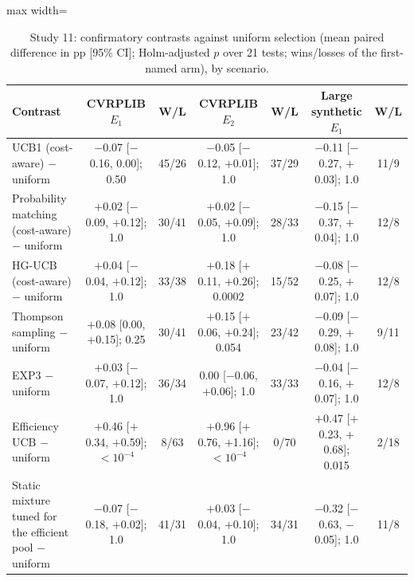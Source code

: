 \begin{table}[t]
\caption{Study 11: confirmatory contrasts against uniform selection (mean paired difference in pp [95\% CI]; Holm-adjusted $p$ over 21 tests; wins/losses of the first-named arm), by scenario.}\label{tab:s11tests}
\centering
\small
\begin{adjustbox}{max width=\linewidth}
\begin{tabular}{lcccccc}
\toprule
Contrast & CVRPLIB $E_1$ & W/L & CVRPLIB $E_2$ & W/L & Large synthetic $E_1$ & W/L \\
\midrule
UCB1 (cost-aware) $-$ uniform & $-$0.07 [$-$0.16, 0.00]; 0.50 & 45/26 & $-$0.05 [$-$0.12, $+$0.01]; 1.0 & 37/29 & $-$0.11 [$-$0.27, $+$0.03]; 1.0 & 11/9 \\
Probability matching (cost-aware) $-$ uniform & $+$0.02 [$-$0.09, $+$0.12]; 1.0 & 30/41 & $+$0.02 [$-$0.05, $+$0.09]; 1.0 & 28/33 & $-$0.15 [$-$0.37, $+$0.04]; 1.0 & 12/8 \\
HG-UCB (cost-aware) $-$ uniform & $+$0.04 [$-$0.04, $+$0.12]; 1.0 & 33/38 & $+$0.18 [$+$0.11, $+$0.26]; 0.0002 & 15/52 & $-$0.08 [$-$0.25, $+$0.07]; 1.0 & 12/8 \\
Thompson sampling $-$ uniform & $+$0.08 [0.00, $+$0.15]; 0.25 & 30/41 & $+$0.15 [$+$0.06, $+$0.24]; 0.054 & 23/42 & $-$0.09 [$-$0.29, $+$0.08]; 1.0 & 9/11 \\
EXP3 $-$ uniform & $+$0.03 [$-$0.07, $+$0.12]; 1.0 & 36/34 & 0.00 [$-$0.06, $+$0.06]; 1.0 & 33/33 & $-$0.04 [$-$0.16, $+$0.07]; 1.0 & 12/8 \\
Efficiency UCB $-$ uniform & $+$0.46 [$+$0.34, $+$0.59]; \ensuremath{<10^{-4}} & 8/63 & $+$0.96 [$+$0.76, $+$1.16]; \ensuremath{<10^{-4}} & 0/70 & $+$0.47 [$+$0.23, $+$0.68]; 0.015 & 2/18 \\
Static mixture tuned for the efficient pool $-$ uniform & $-$0.07 [$-$0.18, $+$0.02]; 1.0 & 41/31 & $+$0.03 [$-$0.04, $+$0.10]; 1.0 & 34/31 & $-$0.32 [$-$0.63, $-$0.05]; 1.0 & 11/8 \\
\bottomrule
\end{tabular}
\end{adjustbox}
\end{table}
